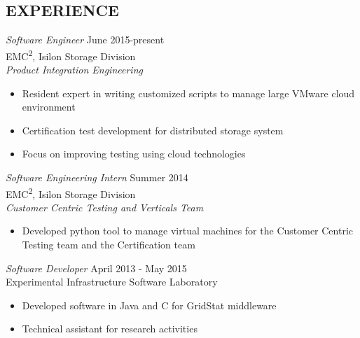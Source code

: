 \documentclass[line, margin]{res}
\begin{document}
\address{225 Cedar St Apt 710, Seattle, WA 98121}
\address{253-508-2725}

 
\begin{resume}

 
 
\section{EXPERIENCE} 
                {\sl Software Engineer} \hfill June 2015-present \\
                EMC\textsuperscript{2}, Isilon Storage Division\\
                {\sl Product Integration Engineering}
                 \begin{itemize}  \itemsep -2pt %
                \item Resident expert in writing customized scripts to manage large VMware 
                cloud environment
                \item Certification test development for distributed storage system
                \item Focus on improving testing using cloud technologies
                \end{itemize}

                {\sl Software Engineering Intern} \hfill Summer 2014 \\
                EMC\textsuperscript{2}, Isilon Storage Division\\
                {\sl Customer Centric Testing and Verticals Team}
                 \begin{itemize}  \itemsep -2pt %
                 \item Developed python tool to manage virtual machines for the
                 Customer Centric Testing team and the Certification team
                \end{itemize}

                {\sl Software Developer} \hfill       April 2013 - May 2015 \\
                Experimental Infrastructure Software Laboratory
            \begin{itemize} \itemsep -2pt
                    \item Developed software in Java and C for GridStat middleware
                    \item Technical assistant for research activities
                \end{itemize}
 

\end{resume}
\end{document}
